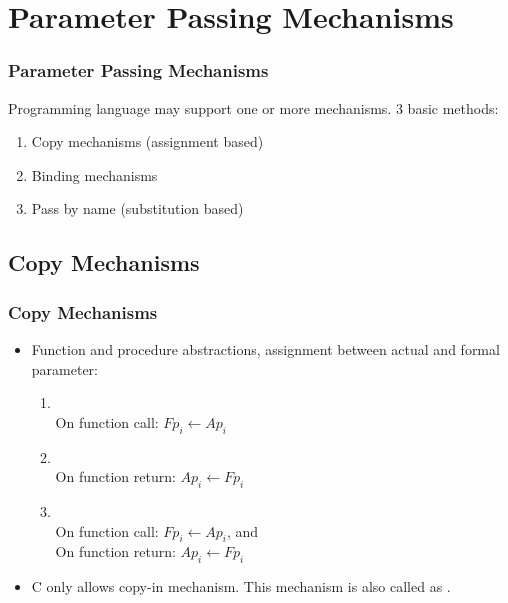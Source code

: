 \section{Parameter Passing Mechanisms}
\begin{frame}
\frametitle{Parameter Passing Mechanisms}
 Programming language may support one or more mechanisms. 3 basic methods:
\begin{enumerate}
 \item Copy mechanisms (assignment based)
 \item Binding mechanisms 
 \item Pass by name (substitution based)
\end{enumerate}
\end{frame}

\subsection{Copy Mechanisms}
\begin{frame}
\frametitle{Copy Mechanisms}
\begin{itemize}[<+->]
 \item Function and procedure abstractions, assignment between actual and formal parameter:
\begin{enumerate}
 \item {} \\
	On function call: $Fp_i \leftarrow Ap_i$
 \item {} \\
	On function return: $Ap_i \leftarrow Fp_i$
 \item {} \\
	On function call: $Fp_i \leftarrow Ap_i$, and\\
	On function return: $Ap_i \leftarrow Fp_i$
\end{enumerate}
 \item C only allows copy-in mechanism. This mechanism is also called as .
\end{itemize}
\end{frame}

